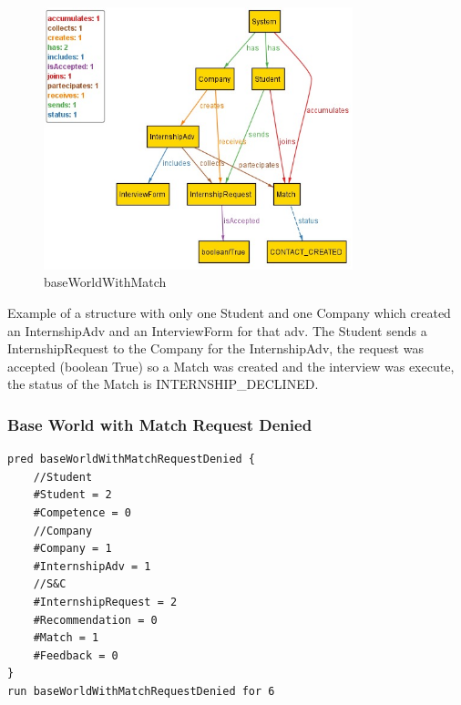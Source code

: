 \begin{figure}[h]
    \centering
    \includegraphics[width=0.8\textwidth]{Images/AlloyModel_images/baseWorldWithMatch.png}
    \caption{baseWorldWithMatch}
    \label{fig:figure2}
\end{figure}
Example of a structure with only one Student and one Company which created an InternshipAdv and an InterviewForm for that adv. The Student sends a InternshipRequest to the Company for the InternshipAdv, the request was accepted (boolean True) so a Match was created and the interview was execute, the status of the Match is INTERNSHIP\_DECLINED.

\clearpage

\subsubsection{Base World with Match Request Denied}
\begin{lstlisting}
pred baseWorldWithMatchRequestDenied {
	//Student
	#Student = 2
	#Competence = 0
	//Company
	#Company = 1
	#InternshipAdv = 1
	//S&C
	#InternshipRequest = 2
	#Recommendation = 0
	#Match = 1
	#Feedback = 0
}
run baseWorldWithMatchRequestDenied for 6
\end{lstlisting}


